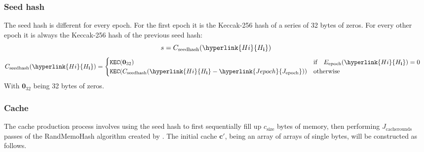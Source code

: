 \documentclass[9pt,oneside]{amsart}
\begin{document}
\subsubsection{Seed hash}
The seed hash is different for every epoch. For the first epoch it is the Keccak-256 hash of a series of 32 bytes of zeros. For every other epoch it is always the Keccak-256 hash of the previous seed hash:
\begin{equation}
 s = C_{\mathrm{\mathrm{\mathrm{seedhash}}}}(\hyperlink{H i}{H_\mathbf{i}})
\end{equation}
\begin{equation}
 C_{\mathrm{\mathrm{\mathrm{seedhash}}}}(\hyperlink{H i}{H_\mathbf{i}}) = \begin{cases}
\texttt{KEC}(\mathbf{0}_{32}) & \text{if} \quad E_{\mathrm{epoch}}(\hyperlink{H i}{H_\mathbf{i}}) = 0 \quad  \\
\texttt{KEC}(C_{\mathrm{\mathrm{\mathrm{seedhash}}}}(\hyperlink{H i}{H_\mathbf{i}} - \hyperlink{Jepoch}{J_{\mathrm{epoch}}})) & \text{otherwise}
\end{cases}
\end{equation}
With $\mathbf{0}_{32}$ being 32 bytes of zeros.

\subsubsection{Cache}
The cache production process involves using the seed hash to first sequentially fill up $c_{\mathrm{size}}$ bytes of memory, then performing \hyperlink{Jcacherounds}{$J_{\mathrm{cacherounds}}$} passes of the RandMemoHash algorithm created by \cite{lerner2014randmemohash}. The initial cache $\mathbf{c'}$, being an array of arrays of single bytes, will be constructed as follows.
\end{document}
